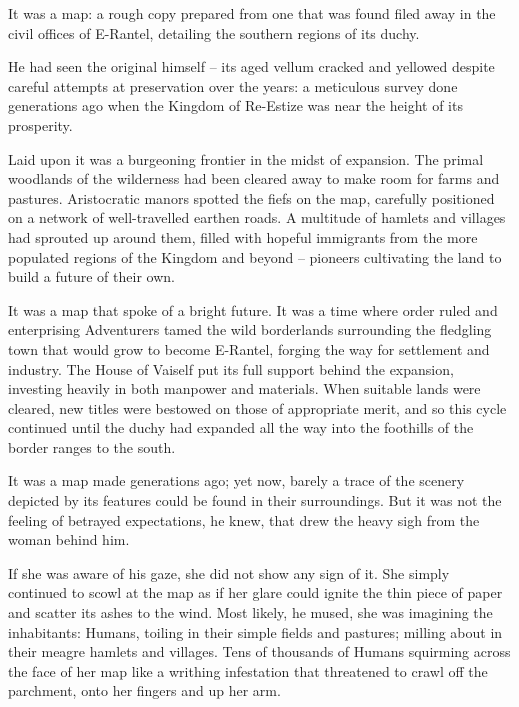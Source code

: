  

It was a map: a rough copy prepared from one that was found filed away in the civil offices of E-Rantel, detailing the southern regions of its duchy.

 

He had seen the original himself – its aged vellum cracked and yellowed despite careful attempts at preservation over the years: a meticulous survey done generations ago when the Kingdom of Re-Estize was near the height of its prosperity.

 

Laid upon it was a burgeoning frontier in the midst of expansion. The primal woodlands of the wilderness had been cleared away to make room for farms and pastures. Aristocratic manors spotted the fiefs on the map, carefully positioned on a network of well-travelled earthen roads. A multitude of hamlets and villages had sprouted up around them, filled with hopeful immigrants from the more populated regions of the Kingdom and beyond – pioneers cultivating the land to build a future of their own.

 

It was a map that spoke of a bright future. It was a time where order ruled and enterprising Adventurers tamed the wild borderlands surrounding the fledgling town that would grow to become E-Rantel, forging the way for settlement and industry. The House of Vaiself put its full support behind the expansion, investing heavily in both manpower and materials. When suitable lands were cleared, new titles were bestowed on those of appropriate merit, and so this cycle continued until the duchy had expanded all the way into the foothills of the border ranges to the south.

 

It was a map made generations ago; yet now, barely a trace of the scenery depicted by its features could be found in their surroundings. But it was not the feeling of betrayed expectations, he knew, that drew the heavy sigh from the woman behind him.

 

If she was aware of his gaze, she did not show any sign of it. She simply continued to scowl at the map as if her glare could ignite the thin piece of paper and scatter its ashes to the wind. Most likely, he mused, she was imagining the inhabitants: Humans, toiling in their simple fields and pastures; milling about in their meagre hamlets and villages. Tens of thousands of Humans squirming across the face of her map like a writhing infestation that threatened to crawl off the parchment, onto her fingers and up her arm.

